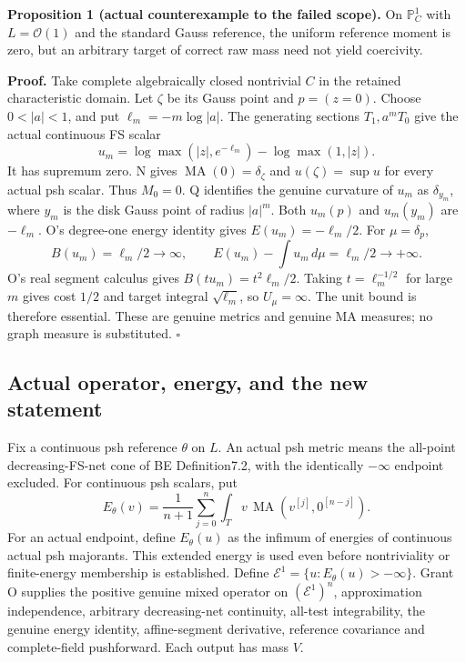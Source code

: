 \documentclass[
  11pt,
]{article}
\begin{document}
\textbf{Proposition 1 (actual counterexample to the failed scope).} On
\(\mathbb P^1_C\) with \(L=\mathcal O(1)\) and the standard Gauss
reference, the uniform reference moment is zero, but an arbitrary target
of correct raw mass need not yield coercivity.

\textbf{Proof.} Take complete algebraically closed nontrivial \(C\) in
the retained characteristic domain. Let \(\zeta\) be its Gauss point and
\(p=(z=0)\). Choose \(0<|a|<1\), and put \(\ell_m=-m\log|a|\). The
generating sections \(T_1,a^mT_0\) give the actual continuous FS scalar
\[
 u_m=\log\max(|z|,e^{-\ell_m})-\log\max(1,|z|).
\] It has supremum zero. N gives \(\operatorname{MA}(0)=\delta_\zeta\)
and \(u(\zeta)=\sup u\) for every actual psh scalar. Thus \(M_0=0\). Q
identifies the genuine curvature of \(u_m\) as \(\delta_{y_m}\), where
\(y_m\) is the disk Gauss point of radius \(|a|^m\). Both \(u_m(p)\) and
\(u_m(y_m)\) are \(-\ell_m\). O's degree-one energy identity gives
\(E(u_m)=-\ell_m/2\). For \(\mu=\delta_p\), \[
 B(u_m)=\ell_m/2\longrightarrow\infty,\qquad
 E(u_m)-\int u_m\,d\mu=\ell_m/2\longrightarrow+\infty.
\] O's real segment calculus gives \(B(tu_m)=t^2\ell_m/2\). Taking
\(t=\ell_m^{-1/2}\) for large \(m\) gives cost \(1/2\) and target
integral \(\sqrt{\ell_m}\), so \(U_\mu=\infty\). The unit bound is
therefore essential. These are genuine metrics and genuine MA measures;
no graph measure is substituted. \(\square\)

\subsection{Actual operator, energy, and the new
statement}\label{actual-operator-energy-and-the-new-statement}

Fix a continuous psh reference \(\theta\) on \(L\). An actual psh metric
means the all-point decreasing-FS-net cone of BE Definition7.2, with the
identically \(-\infty\) endpoint excluded. For continuous psh scalars,
put \[
 E_\theta(v)=\frac1{n+1}\sum_{j=0}^n\int_T v\,
 \operatorname{MA}(v^{[j]},0^{[n-j]}).
\] For an actual endpoint, define \(E_\theta(u)\) as the infimum of
energies of continuous actual psh majorants. This extended energy is
used even before nontriviality or finite-energy membership is
established. Define \(\mathcal E^1=\{u:E_\theta(u)>-\infty\}\). Grant O
supplies the positive genuine mixed operator on \((\mathcal E^1)^n\),
approximation independence, arbitrary decreasing-net continuity,
all-test integrability, the genuine energy identity, affine-segment
derivative, reference covariance and complete-field pushforward. Each
output has mass \(V\).
\end{document}
